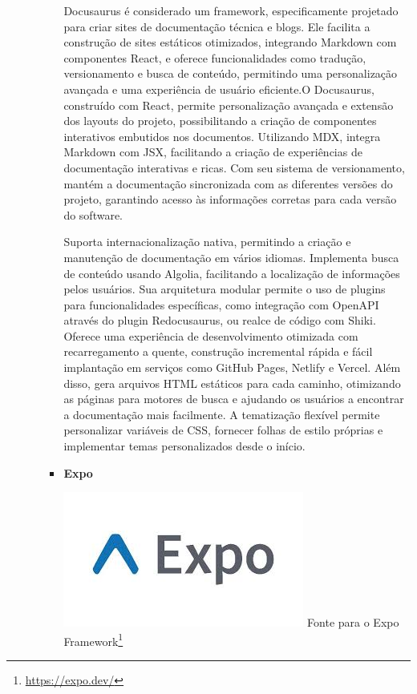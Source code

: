 \begin{itemize}
\begin{itemize}
\begin{itemize}
Docusaurus é considerado um framework, especificamente projetado para criar sites de documentação técnica e blogs. Ele facilita a construção de sites estáticos otimizados, integrando Markdown com componentes React, e oferece funcionalidades como tradução, versionamento e busca de conteúdo, permitindo uma personalização avançada e uma experiência de usuário eficiente.O Docusaurus, construído com React, permite personalização avançada e extensão dos layouts do projeto, possibilitando a criação de componentes interativos embutidos nos documentos. Utilizando MDX, integra Markdown com JSX, facilitando a criação de experiências de documentação interativas e ricas. Com seu sistema de versionamento, mantém a documentação sincronizada com as diferentes versões do projeto, garantindo acesso às informações corretas para cada versão do software. 


Suporta internacionalização nativa, permitindo a criação e manutenção de documentação em vários idiomas. Implementa busca de conteúdo usando Algolia, facilitando a localização de informações pelos usuários. Sua arquitetura modular permite o uso de plugins para funcionalidades específicas, como integração com OpenAPI através do plugin Redocusaurus, ou realce de código com Shiki. Oferece uma experiência de desenvolvimento otimizada com recarregamento a quente, construção incremental rápida e fácil implantação em serviços como GitHub Pages, Netlify e Vercel. Além disso, gera arquivos HTML estáticos para cada caminho, otimizando as páginas para motores de busca e ajudando os usuários a encontrar a documentação mais facilmente. A tematização flexível permite personalizar variáveis de CSS, fornecer folhas de estilo próprias e implementar temas personalizados desde o início.

    
    \item \textbf{Expo}
    \begin{center}
    \includegraphics[width=0.5\linewidth]{figuras/Tecnologies/Expo Framework.jpeg}
    \label{fig:Expo}
    Fonte para o Expo Framework\footnote{\url{https://expo.dev/}}
\end{center}


\end{itemize}
\end{itemize}
\end{itemize}
